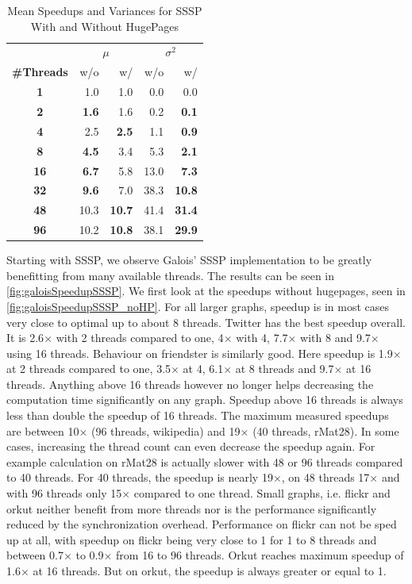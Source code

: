 \begin{table}
\renewcommand{\arraystretch}{1.3}
\centering
\caption{Mean Speedups and Variances for SSSP With and Without HugePages}
\label{tbl:ssspMeansVariances}
\begin{tabular}{c
r@{\tabskip 1 \tabcolsep}r
r@{\tabskip 1 \tabcolsep}r}
\toprule
&\multicolumn{2}{c}{\!\!\!$\mu$}&\multicolumn{2}{c}{\!\!$\sigma^2$}\\
\cmidrule(r){2-3}\cmidrule(r){4-5}
{\bf\#Threads}&w/o&w/&w/o&w/\\\midrule
\bf1 & 1.0 & 1.0 & 0.0 & 0.0 \\
\bf2 & \bf 1.6 & 1.6 & 0.2 & \bf 0.1 \\
\bf4 & 2.5 & \bf 2.5 & 1.1 & \bf 0.9 \\
\bf8 & \bf 4.5 & 3.4 & 5.3 & \bf 2.1 \\
\bf16 & \bf 6.7 & 5.8 & 13.0 & \bf 7.3 \\
\bf32 & \bf 9.6 & 7.0 & 38.3 & \bf 10.8 \\
\bf48 & 10.3 & \bf 10.7 & 41.4 & \bf 31.4 \\
\bf96 & 10.2 & \bf 10.8 & 38.1 & \bf 29.9 \\
\bottomrule
\end{tabular}
\end{table}

Starting with SSSP, we observe Galois' SSSP implementation to be greatly benefitting from many available threads. The results can be seen in \autoref{fig:galoisSpeedupSSSP}.
We first look at the speedups without hugepages, seen in \autoref{fig:galoisSpeedupSSSP_noHP}.
For all larger graphs, speedup is in most cases very close to optimal up to about 8 threads.
Twitter has the best speedup overall. It is 2.6$\times$ with 2 threads compared to one, 4$\times$ with 4, 7.7$\times$ with 8 and 9.7$\times$ using 16 threads.
Behaviour on friendster is similarly good. Here speedup is 1.9$\times$ at 2 threads compared to one, 3.5$\times$ at 4, 6.1$\times$ at 8 threads and 9.7$\times$ at 16 threads.
Anything above 16 threads however no longer helps decreasing the computation time significantly on any graph. Speedup above 16 threads is always less than double the speedup of 16 threads. The maximum measured speedups are between 10$\times$ (96 threads, wikipedia) and 19$\times$ (40 threads, rMat28).
In some cases, increasing the thread count can even decrease the speedup again. For example calculation on rMat28 is actually slower with 48 or 96 threads compared to 40 threads. For 40 threads, the speedup is nearly 19$\times$, on 48 threads 17$\times$ and with 96 threads only 15$\times$ compared to one thread.
Small graphs, i.e. flickr and orkut neither benefit from more threads nor is the performance significantly reduced by the synchronization overhead.
Performance on flickr can not be sped up at all, with speedup on flickr being very close to 1 for 1 to 8 threads and between 0.7$\times$ to 0.9$\times$ from 16 to 96 threads.
Orkut reaches maximum speedup of 1.6$\times$ at 16 threads. But on orkut, the speedup is always greater or equal to 1.

